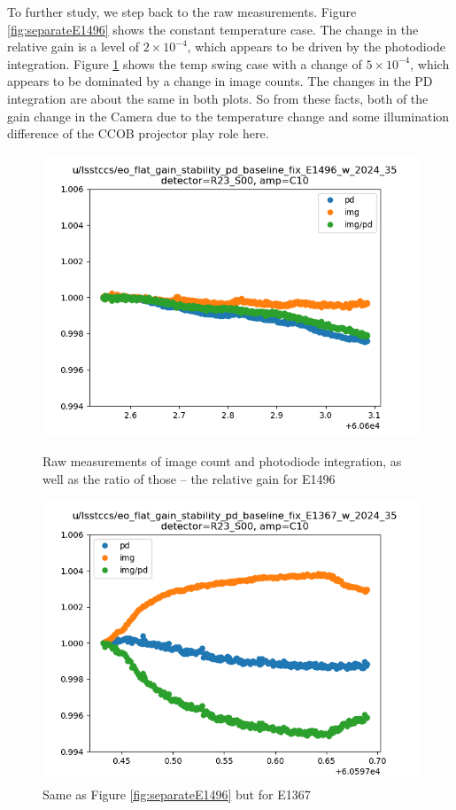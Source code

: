 To further study, we step back to the raw measurements. Figure \ref{fig:separateE1496} shows the constant temperature case. The change in the relative gain is a level of $2\times 10^{-4}$, which appears to be driven by the photodiode integration.
Figure \ref{fig:separateE1367} shows the temp swing case with a change of $5\times10^{-4}$, which appears to be dominated by a change in image counts. The changes in the PD integration are about the same in both plots. So from these facts, both of the gain change in the Camera due to the temperature change and some illumination difference of the CCOB projector play role here.
\begin{figure}[htbp]
\centering
\begin{minipage}{0.45\textwidth}
    \centering
    \includegraphics[width=\textwidth]{figures/gaintemp/E1496separate.png}
    \caption{Raw measurements of image count and photodiode integration, as well as the ratio of those -- the relative gain for E1496}
    \label{fig:separateE1496}
\end{minipage}
\hfill
\begin{minipage}{0.45\textwidth}
    \centering
    \includegraphics[width=\textwidth]{figures/gaintemp/E1367separate.png}
    \caption{Same as Figure \ref{fig:separateE1496} but for E1367}
    \label{fig:separateE1367}
\end{minipage}
\end{figure}

